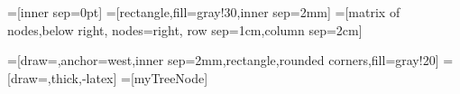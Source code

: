 
\newcommand\westTowest[3][-latex]{\draw[very thick,#1](#2.west) to[out=180,in=180] (#3.west);}
\newcommand\westTonorth[3][-latex]{\draw[very thick,#1](#2.west) to[out=180,in=90] (#3.north);}
\newcommand{\mySection}[1]{\section*{\texttt{#1}}}

=[inner sep=0pt]
=[rectangle,fill=gray!30,inner sep=2mm]
=[matrix of nodes,below right,
nodes={right},                  %
row sep=1cm,column sep=2cm]

=[draw=\mycola,anchor=west,inner sep=2mm,rectangle,rounded corners,fill=gray!20]
=[draw=\mycola,thick,-latex]
=[myTreeNode]

\usepackage{simpsons}
\usepackage{cleveref}





